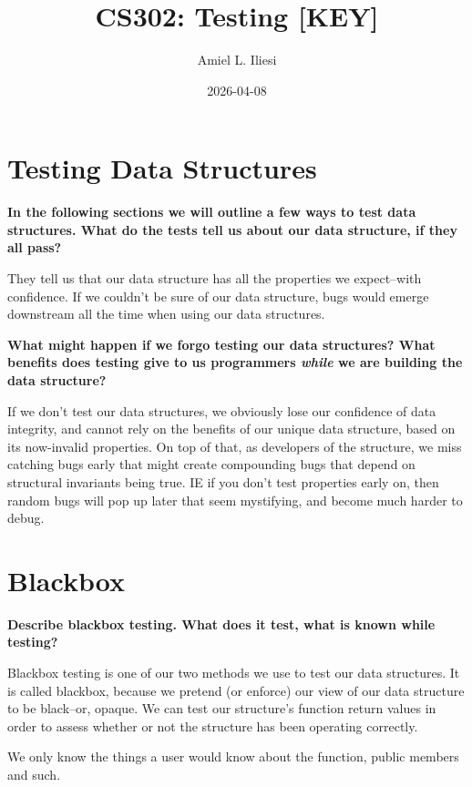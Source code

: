\documentclass[12pt, letterpaper]{article}
\title{CS302: Testing \color{red}\textbf{[KEY]}\normalcolor}
\author{Amiel L. Iliesi}
\date{2026-04-08}
\newcommand{\question}[1]{\textbf{#1}\par}
\newenvironment{answerblock}{\color{Green4}}{\normalcolor\vspace{1em}}
\begin{document}
\maketitle

\tableofcontents

\pagebreak
\section{Testing Data Structures}

\question{In the following sections we will outline a few ways to test data
structures. What do the tests tell us about our data structure, if they all
pass?}

\begin{answerblock}
They tell us that our data structure has all the properties we expect--with
confidence. If we couldn't be sure of our data structure, bugs would emerge
downstream all the time when using our data structures.
\end{answerblock}

\question{What might happen if we forgo testing our data structures? What
benefits does testing give to us programmers \emph{while} we are building the
data structure?}

\begin{answerblock}
If we don't test our data structures, we obviously lose our confidence of data
integrity, and cannot rely on the benefits of our unique data structure, based
on its now-invalid properties. On top of that, as developers of the structure,
we miss catching bugs early that might create compounding bugs that depend on
structural invariants being true. IE if you don't test properties early on,
then random bugs will pop up later that seem mystifying, and become much harder
to debug.
\end{answerblock}

\pagebreak
\section{Blackbox}

\question{Describe blackbox testing. What does it test, what is known while
testing?}

\begin{answerblock}
Blackbox testing is one of our two methods we use to test our data structures.
It is called blackbox, because we pretend (or enforce) our view of our data
structure to be black--or, opaque. We can test our structure's function return
values in order to assess whether or not the structure has been operating
correctly.

We only know the things a user would know about the function, public members
and such.
\end{answerblock}
\end{document}
